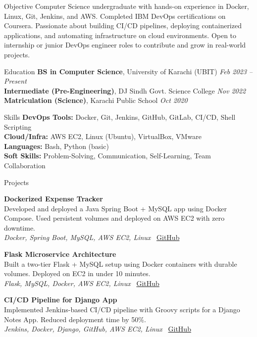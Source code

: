 \documentclass{resume}
\begin{document}
\begin{rSection}{Objective}
Computer Science undergraduate with hands-on experience in Docker, Linux, Git, Jenkins, and AWS. Completed IBM DevOps certifications on Coursera. Passionate about building CI/CD pipelines, deploying containerized applications, and automating infrastructure on cloud environments. Open to internship or junior DevOps engineer roles to contribute and grow in real-world projects.
\end{rSection}

\begin{rSection}{Education}
\textbf{BS in Computer Science}, University of Karachi (UBIT) \hfill \textit{Feb 2023 -- Present} \\
\textbf{Intermediate (Pre-Engineering)}, DJ Sindh Govt. Science College \hfill \textit{Nov 2022} \\
\textbf{Matriculation (Science)}, Karachi Public School \hfill \textit{Oct 2020}
\end{rSection}

\begin{rSection}{Skills}
\textbf{DevOps Tools:} Docker, Git, Jenkins, GitHub, GitLab, CI/CD, Shell Scripting \\
\textbf{Cloud/Infra:} AWS EC2, Linux (Ubuntu), VirtualBox, VMware \\
\textbf{Languages:} Bash, Python (basic) \\
\textbf{Soft Skills:} Problem-Solving, Communication, Self-Learning, Team Collaboration
\end{rSection}

\begin{rSection}{Projects}

\item \textbf{Dockerized Expense Tracker} \\
Developed and deployed a Java Spring Boot + MySQL app using Docker Compose. Used persistent volumes and deployed on AWS EC2 with zero downtime. \\
\textit{\small Docker, Spring Boot, MySQL, AWS EC2, Linux} \hfill \faGithub~\href{https://github.com/SufiyanKhanCloud/docker-practice/tree/main/Expenses-Tracker-WebApp}{GitHub}

\item \textbf{Flask Microservice Architecture} \\
Built a two-tier Flask + MySQL setup using Docker containers with durable volumes. Deployed on EC2 in under 10 minutes. \\
\textit{\small Flask, MySQL, Docker, AWS EC2, Linux} \hfill \faGithub~\href{https://github.com/SufiyanKhanCloud/docker-practice/tree/main/two-tier-flask-app}{GitHub}

\item \textbf{CI/CD Pipeline for Django App} \\
Implemented Jenkins-based CI/CD pipeline with Groovy scripts for a Django Notes App. Reduced deployment time by 50\%. \\
\textit{\small Jenkins, Docker, Django, GitHub, AWS EC2, Linux} \hfill \faGithub~\href{https://github.com/SufiyanKhanCloud/Django-Notes-App}{GitHub}

\end{rSection}
\end{document}
